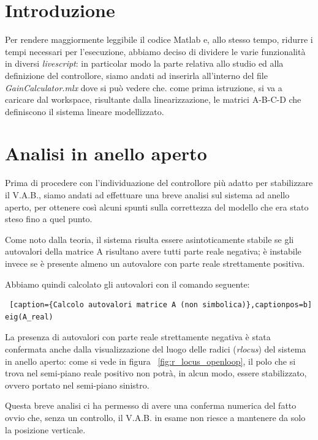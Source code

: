 \section{Introduzione}
Per rendere maggiormente leggibile il codice Matlab e, allo stesso tempo, ridurre i tempi necessari per l'esecuzione, abbiamo deciso di dividere le varie funzionalità in diversi \textit{livescript}: in particolar modo la parte relativa allo studio ed alla definizione del controllore, siamo andati ad inserirla all'interno del file \textit{GainCalculator.mlx} dove si può vedere che. come prima istruzione, si va a caricare dal workspace, risultante dalla linearizzazione, le matrici A-B-C-D che definiscono il sistema lineare modellizzato.

\section{Analisi in anello aperto}
\label{sec:open_loop_analysis}
Prima di procedere con l'individuazione del controllore più adatto per stabilizzare il V.A.B., siamo andati ad effettuare una breve analisi sul sistema ad anello aperto, per ottenere così alcuni spunti sulla correttezza del modello che era stato steso fino a quel punto.

Come noto dalla teoria, il sistema risulta essere asintoticamente stabile se gli autovalori della matrice A risultano avere tutti parte reale negativa; è instabile invece se è presente almeno un autovalore con parte reale strettamente positiva.

Abbiamo quindi calcolato gli autovalori con il comando seguente:
\begin{lstlisting} [caption={Calcolo autovalori matrice A (non simbolica)},captionpos=b]
eig(A_real)
\end{lstlisting}

La presenza di autovalori con parte reale strettamente negativa è stata confermata anche dalla visualizzazione del luogo delle radici (\textit{rlocus}) del sistema in anello aperto: come si vede in figura ~\ref{fig:r_locus_openloop}, il polo che si trova nel semi-piano reale positivo non potrà, in alcun modo, essere stabilizzato, ovvero portato nel semi-piano sinistro.

Questa breve analisi ci ha permesso di avere una conferma numerica del fatto ovvio che, senza un controllo, il V.A.B. in esame non riesce a mantenere da solo la posizione verticale.

